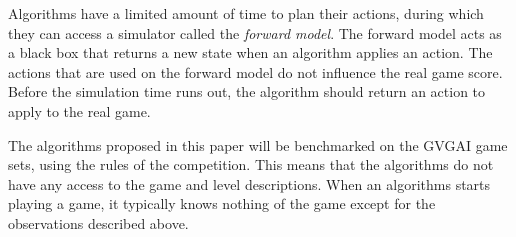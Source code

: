Algorithms have a limited amount of time to plan their actions, during which
they can access a simulator called the \emph{forward model}. The forward model
acts as a black box that returns a new state when an algorithm applies an
action. The actions that are used on the forward model do not influence the real
game score. Before the simulation time runs out, the algorithm should return an
action to apply to the real game.

The algorithms proposed in this paper will be benchmarked on the GVGAI game
sets, using the rules of the competition. This means that the algorithms do not
have any access to the game and level descriptions. When an algorithms starts
playing a game, it typically knows nothing of the game except for the
observations described above.
